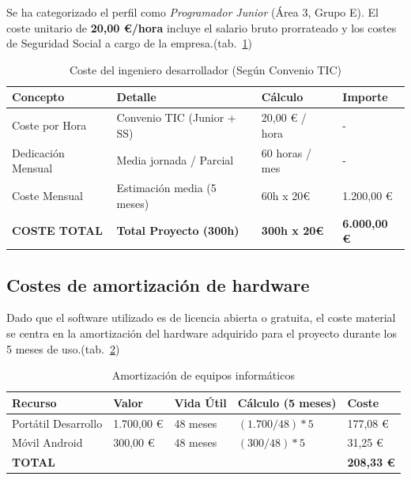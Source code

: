 Se ha categorizado el perfil como \textit{Programador Junior} (Área 3, Grupo E). El coste unitario de \textbf{20,00 €/hora} incluye el salario bruto prorrateado y los costes de Seguridad Social a cargo de la empresa.(tab.~\ref{tab:coste_ingeniero})

\begin{table}[h]
\small
\centering
\caption{Coste del ingeniero desarrollador (Según Convenio TIC)}
\label{tab:coste_ingeniero}
\begin{tabular}{p{} p{} p{} p{}}
    \toprule
    \textbf{Concepto} & \textbf{Detalle} & \textbf{Cálculo} & \textbf{Importe} \\
    \midrule
    Coste por Hora & Convenio TIC (Junior + SS) & 20,00 € / hora & - \\
    \midrule
    Dedicación Mensual & Media jornada / Parcial & 60 horas / mes & - \\
    \midrule
    Coste Mensual & Estimación media (5 meses) & 60h x 20€ & 1.200,00 € \\
    \midrule
    \textbf{COSTE TOTAL} & \textbf{Total Proyecto (300h)} & \textbf{300h x 20€} & \textbf{6.000,00 €} \\
    \bottomrule
\end{tabular}
\end{table}

\subsection{Costes de amortización de hardware}
Dado que el software utilizado es de licencia abierta o gratuita, el coste material se centra en la amortización del hardware adquirido para el proyecto durante los 5 meses de uso.(tab.~\ref{tab:amortizacion})

\begin{table}[h]
\small
\centering
\caption{Amortización de equipos informáticos}
\label{tab:amortizacion}
\begin{tabular}{p{} p{} p{} p{} p{}}
    \toprule
    \textbf{Recurso} & \textbf{Valor} & \textbf{Vida Útil} & \textbf{Cálculo (5 meses)} & \textbf{Coste} \\
    \midrule
    Portátil Desarrollo & 1.700,00 € & 48 meses & $(1.700 / 48) * 5$ & 177,08 € \\
    \midrule
    Móvil Android & 300,00 € & 48 meses & $(300 / 48) * 5$ & 31,25 € \\
    \midrule
    \textbf{TOTAL} & & & & \textbf{208,33 €} \\
    \bottomrule
\end{tabular}
\end{table}

